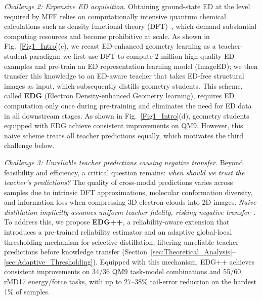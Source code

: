 \textit{Challenge 2: Expensive ED acquisition.} Obtaining ground-state ED at the level required by MFF relies on computationally intensive quantum chemical calculations such as density functional theory (DFT)~\cite{kohn1965self,hegde2017machine,lee2024convolutional}, which demand substantial computing resources and become prohibitive at scale. As shown in Fig.~\ref{Fig1_Intro}(c), we recast ED-enhanced geometry learning as a teacher-student paradigm: we first use DFT to compute 2 million high-quality ED examples and pre-train an ED representation learning model (ImageED); we then transfer this knowledge to an ED-aware teacher that takes ED-free structural images as input, which subsequently distills geometry students. This scheme, called \textbf{EDG} (Electron Density-enhanced Geometry learning), requires ED computation only once during pre-training and eliminates the need for ED data in all downstream stages. As shown in Fig.~\ref{Fig1_Intro}(d), geometry students equipped with EDG achieve consistent improvements on QM9. However, this naive scheme treats all teacher predictions equally, which motivates the third challenge below.

\textit{Challenge 3: Unreliable teacher predictions causing negative transfer.} Beyond feasibility and efficiency, a critical question remains: \emph{when should we trust the teacher's predictions?} The quality of cross-modal predictions varies across samples due to intrinsic DFT approximations, molecular conformation diversity, and information loss when compressing 3D electron clouds into 2D images. \emph{Naive distillation implicitly assumes uniform teacher fidelity, risking negative transfer}~\cite{pan2010survey}. To address this, we propose \textbf{EDG++}, a reliability-aware extension that introduces a pre-trained reliability estimator and an adaptive global-local thresholding mechanism for selective distillation, filtering unreliable teacher predictions before knowledge transfer (Section~\ref{sec:Theoretical_Analysis}--\ref{sec:Adaptive_Thresholding}). Equipped with this mechanism, EDG++ achieves consistent improvements on 34/36 QM9 task-model combinations and 55/60 rMD17 energy/force tasks, with up to 27--38\% tail-error reduction on the hardest 1\% of samples.

